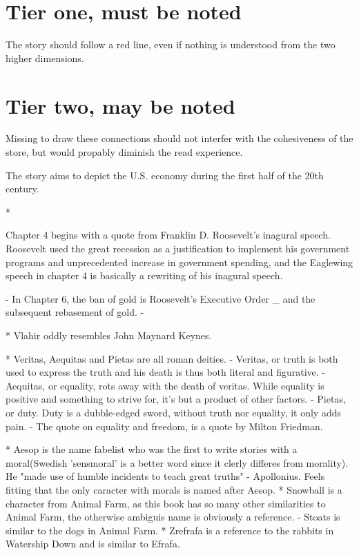 
\section{Tier one, must be noted}

The story should follow a red line, even if nothing is understood from the two higher dimensions.


\section{Tier two, may be noted}

Missing to draw these connections should not interfer with the cohesiveness of the store,
but would propably diminish the read experience.

The story aims to depict the U.S. economy during the first half of the 20th century.


* 

Chapter 4 begins with a quote from Franklin D. Roosevelt's inagural speech.
Roosevelt used the great recession as a justification to implement his government
programs and unprecedented increase in government spending, and the Eaglewing
speech in chapter 4 is basically a rewriting of his inagural speech. 


- In Chapter 6, the ban of gold is Roosevelt's Executive Order _ and the subsequent 
rebasement of gold.
- 

* Vlahir oddly resembles John Maynard Keynes.

* Veritas, Aequitas and Pietas are all roman deities. 
- Veritas, or truth is both used to express the truth and his death is thus both literal and figurative.
- Aequitas, or equality, rots away with the death of veritas. While equality is positive and something to strive 
for, it's but a product of other factors. 
- Pietas, or duty. Duty is a dubble-edged sword, without truth nor equality, it only adds pain.
- The quote on equality and freedom, is a quote by Milton Friedman. 


* Aesop is the name fabelist who was the first to write stories with a moral(Swedish 'sensmoral' is a better word since it clerly differes from morality). He "made use of humble incidents to teach great truths" - Apollonius. Feels fitting that the only caracter with morals is named
after Aesop.
* Snowball is a character from Animal Farm, as this book has so many other similarities to Animal Farm, the otherwise ambiguis name is obviously a reference.
- Stoats is similar to the dogs in Animal Farm.
* Zrefrafa is a reference to the rabbits in Watership Down and is similar to Efrafa.

